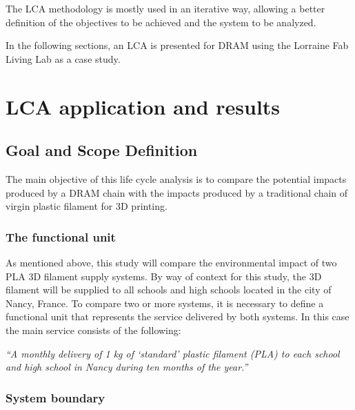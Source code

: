 \documentclass[12pt]{elsarticle} %
\begin{document}
The LCA methodology is mostly used in an iterative way, allowing a better definition of the objectives to be achieved and the system to be analyzed.

In the following sections, an LCA is presented for DRAM using the Lorraine Fab Living Lab as a case study.

\hypertarget{LCA}{%
\section{LCA application and results}\label{LCA}}

\hypertarget{goal-and-scope-definition}{%
\subsection{Goal and Scope Definition}\label{goal-and-scope-definition}}

The main objective of this life cycle analysis is to compare the potential impacts produced by a DRAM chain with the impacts produced by a traditional chain of virgin plastic filament for 3D printing.

\hypertarget{the-functional-unit}{%
\subsubsection{The functional unit}\label{the-functional-unit}}

As mentioned above, this study will compare the environmental impact of two PLA 3D filament supply systems. By way of context for this study, the 3D filament will be supplied to all schools and high schools located in the city of Nancy, France. To compare two or more systems, it is necessary to define a functional unit that represents the service delivered by both systems. In this case the main service consists of the following:

\emph{``A monthly delivery of 1 kg of `standard' plastic filament (PLA) to each school and high school in Nancy during ten months of the year.''}

\hypertarget{system-boundary}{%
\subsubsection{System boundary}\label{system-boundary}}
\end{document}
